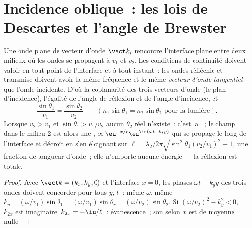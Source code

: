 \section{Incidence oblique~: les lois de Descartes et l'angle de Brewster}

\begin{theorem}\label{thm:b2:wave-interfaces:snell}
Une onde plane de vecteur d'onde $\vect k_i$ rencontre l'interface plane entre
deux milieux où les ondes se propagent à $v_1$ et $v_2$. Les conditions de
continuité doivent valoir en tout point de l'interface et à tout instant~:
les ondes réfléchie et transmise doivent avoir la même fréquence et
le même \emph{vecteur d'onde tangentiel} que l'onde incidente. D'où
la coplanarité des trois vecteurs d'onde (le plan d'incidence), l'égalité de l'angle
de réflexion et de l'angle d'incidence, et
\[
\frac{\sin\theta_1}{v_1} = \frac{\sin\theta_2}{v_2} \qquad (n_1\sin\theta_1 = n_2\sin\theta_2 \text{ pour la lumière}) .
\]
Lorsque $v_2 > v_1$ et $\sin\theta_1 > v_1/v_2$ aucun $\theta_2$ réel n'existe~:
c'est la \emph{}~; le champ dans le milieu 2 est alors une
\emph{}, $\propto\eu^{-x/\ell}\eu^{\iu(\omega t - k_ty)}$ qui se propage
le long de l'interface et décroît en s'en éloignant sur $\ell = \lambda_2/2\pi
\sqrt{\sin^2\theta_1(v_2/v_1)^2 - 1}$, une fraction de longueur d'onde~; elle
n'emporte aucune énergie --- la réflexion est totale.
\end{theorem}

\begin{proof}
Avec $\vect k = (k_x, k_y, 0)$ et l'interface $x = 0$, les phases
$\omega t - k_yy$ des trois ondes doivent concorder pour tous $y$, $t$~: même
$\omega$, même $k_y = (\omega/v_1)\sin\theta_1 = (\omega/v_1)\sin\theta_r = (\omega/v_2)\sin
\theta_2$. Si $(\omega/v_2)^2 - k_y^2 < 0$, $k_{2x}$ est imaginaire, $k_{2x} = -\iu/\ell$~:
évanescence~; son  selon $x$ est de moyenne nulle.
\end{proof}

